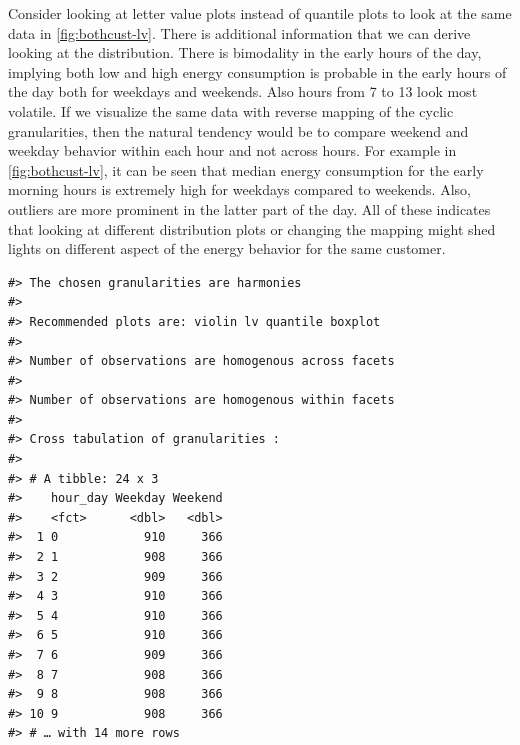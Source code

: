 \documentclass[12pt]{article}
\newenvironment{Shaded}{\begin{snugshade}}{\end{snugshade}}
\newcommand{\DecValTok}[1]{\textcolor[rgb]{0.00,0.00,0.81}{#1}}
\newcommand{\KeywordTok}[1]{\textcolor[rgb]{0.13,0.29,0.53}{\textbf{#1}}}
\newcommand{\NormalTok}[1]{#1}
\newcommand{\OperatorTok}[1]{\textcolor[rgb]{0.81,0.36,0.00}{\textbf{#1}}}
\newcommand{\StringTok}[1]{\textcolor[rgb]{0.31,0.60,0.02}{#1}}
\begin{document}
Consider looking at letter value plots instead of quantile plots to look at the same data in \autoref{fig:bothcust-lv}. There is additional information that we can derive looking at the distribution.
There is bimodality in the early hours of the day, implying both low and high energy consumption is probable in the early hours of the day both for weekdays and weekends. Also hours from 7 to 13 look most volatile. If we visualize the same data with reverse mapping of the cyclic granularities, then the natural tendency would be to compare weekend and weekday behavior within each hour and not across hours. For example in \autoref{fig:bothcust-lv}, it can be seen that median energy consumption for the early morning hours is extremely high for weekdays compared to weekends. Also, outliers are more prominent in the latter part of the day. All of these indicates that looking at different distribution plots or changing the mapping might shed lights on different aspect of the energy behavior for the same customer.

\begin{Shaded}
\end{Shaded}

\begin{verbatim}
#> The chosen granularities are harmonies 
#>  
#> Recommended plots are: violin lv quantile boxplot 
#>  
#> Number of observations are homogenous across facets 
#>  
#> Number of observations are homogenous within facets 
#>  
#> Cross tabulation of granularities : 
#>  
#> # A tibble: 24 x 3
#>    hour_day Weekday Weekend
#>    <fct>      <dbl>   <dbl>
#>  1 0            910     366
#>  2 1            908     366
#>  3 2            909     366
#>  4 3            910     366
#>  5 4            910     366
#>  6 5            910     366
#>  7 6            909     366
#>  8 7            908     366
#>  9 8            908     366
#> 10 9            908     366
#> # … with 14 more rows
\end{verbatim}
\end{document}
